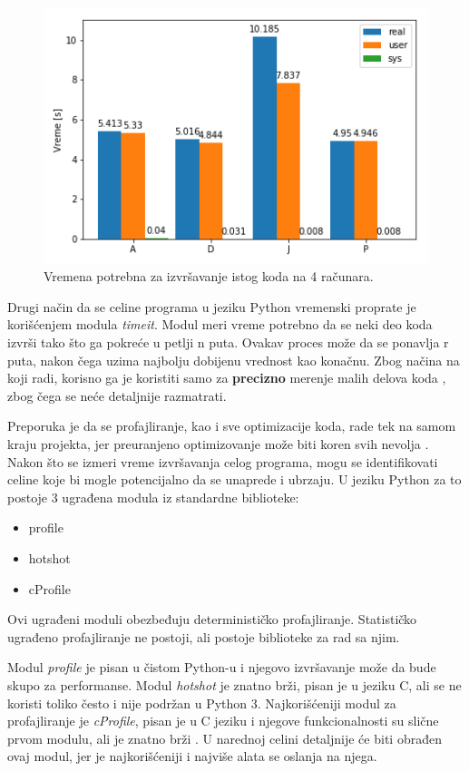 \documentclass[a4paper]{article}
\begin{document}
\begin{figure}[h!]
\begin{center}
\includegraphics[scale=0.7]{MVJ_02_ProfajleriZaPython_ZecevicSmiljanicMilovanovicPopov/barplot.png}
\end{center}
\caption{Vremena potrebna za izvršavanje istog koda na 4 računara.}
\label{fig:custom_time}
\end{figure}


Drugi način da se celine programa u jeziku Python vremenski proprate je korišćenjem modula {\em timeit}. Modul meri vreme potrebno da se neki deo koda izvrši tako što ga pokreće u petlji n puta. Ovakav proces može da se ponavlja r puta, nakon čega uzima najbolju dobijenu vrednost kao konačnu. Zbog načina na koji radi, korisno ga je koristiti samo za \textbf{precizno} merenje malih delova koda \cite{lanaro2013python}, zbog čega se neće detaljnije razmatrati.

Preporuka je da se profajliranje, kao i sve optimizacije koda, rade tek na samom kraju projekta, jer preuranjeno optimizovanje može biti koren svih nevolja \cite{knuth}.
Nakon što se izmeri vreme izvršavanja celog programa, mogu se identifikovati celine koje bi mogle potencijalno da se unaprede i ubrzaju. U jeziku Python za to postoje 3 ugrađena modula iz standardne biblioteke: 
\begin{itemize}
  \item profile
  \item hotshot
  \item cProfile
\end{itemize}
Ovi ugrađeni moduli obezbeđuju determinističko profajliranje. Statističko ugrađeno profajliranje ne postoji, ali postoje biblioteke za rad sa njim.

Modul {\em profile} je pisan u čistom Python-u i njegovo izvršavanje može da bude skupo za performanse. Modul {\em hotshot} je znatno brži, pisan je u jeziku C, ali se ne koristi toliko često i nije podržan u Python 3. Najkorišćeniji modul za profajliranje je {\em cProfile}, pisan je u C jeziku i njegove funkcionalnosti su slične prvom modulu, ali je znatno brži \cite{cProfile}. U narednoj celini detaljnije će biti obrađen ovaj modul, jer je najkorišćeniji i najviše alata se oslanja na njega.
\end{document}
